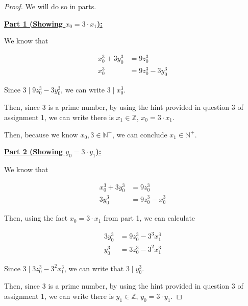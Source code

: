 \documentclass[12pt]{article}
\begin{document}
\begin{itemize}
\begin{proof}
        \bigskip

        We will do so in parts.

        \bigskip

        \underline{\textbf{Part 1 (Showing $x_0 = 3 \cdot x_1$):}}

        \bigskip

        We know that

        \begin{align}
            x_0^3 + 3y_0^3 &= 9z_0^3\\
            x_0^3 &= 9z_0^3 - 3y_0^3
        \end{align}

        \bigskip

        Since $3 \mid 9z_0^3 - 3y_0^3$, we can write $3 \mid x_0^3$.

        \bigskip

        Then, since 3 is a prime number, by using the hint provided in question 3
        of assignment 1, we can write there is $x_1 \in \mathbb{Z}$, $x_0 = 3 \cdot x_1$.

        \bigskip

        Then, because we know $x_0, 3 \in \mathbb{N}^+$, we can conclude
        $x_1 \in \mathbb{N}^+$.

        \bigskip

        \underline{\textbf{Part 2 (Showing $y_0 = 3 \cdot y_1$):}}

        \bigskip

        We know that

        \begin{align}
            x_0^3 + 3y_0^3 &= 9z_0^3\\
            3y_0^3 &= 9z_0^3 - x_0^3
        \end{align}

        \bigskip

        Then, using the fact $x_0 = 3 \cdot x_1$ from part 1, we can calculate

        \begin{align}
            3y_0^3 &= 9z_0^3 - 3^3x_1^3\\
            y_0^3 &= 3z_0^3 - 3^2x_1^3
        \end{align}

        \bigskip

        Since $3 \mid 3z_0^3 - 3^2x_1^3$, we can write that $3 \mid y_0^3$.

        \bigskip

        Then, since 3 is a prime number, by using the hint provided in question 3
        of assignment 1, we can write there is $y_1 \in \mathbb{Z}$, $y_0 = 3 \cdot y_1$.


\end{proof}
\end{itemize}
\end{document}

